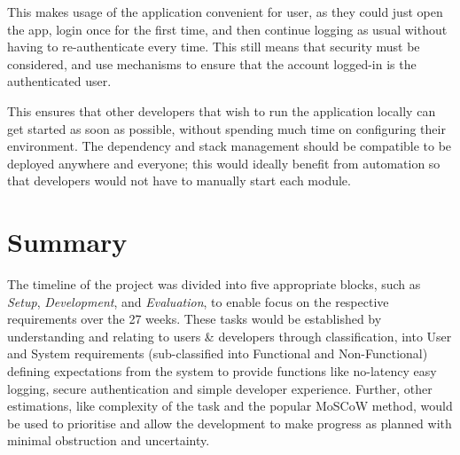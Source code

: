 \documentclass[../main.tex]{subfiles}
\begin{document}

This makes usage of the application convenient for user, as they could just open the app, login once for the first time, and then continue logging as usual without having to re-authenticate every time. This still means that security must be considered, and use mechanisms to ensure that the account logged-in is the authenticated user.


This ensures that other developers that wish to run the application locally can get started as soon as possible, without spending much time on configuring their environment. The dependency and stack management should be compatible to be deployed anywhere and everyone; this would ideally benefit from automation so that developers would not have to manually start each module.

\section*{Summary}

The timeline of the project was divided into five appropriate blocks, such as \textit{Setup}, \textit{Development}, and \textit{Evaluation}, to enable focus on the respective requirements over the 27 weeks. These tasks would be established by understanding and relating to users \& developers through classification, into User and System requirements (sub-classified into Functional and Non-Functional) defining expectations from the system to provide functions like no-latency easy logging, secure authentication and simple developer experience. Further, other estimations, like complexity of the task and the popular MoSCoW method, would be used to prioritise and allow the development to make progress as planned with minimal obstruction and uncertainty.
\end{document}
